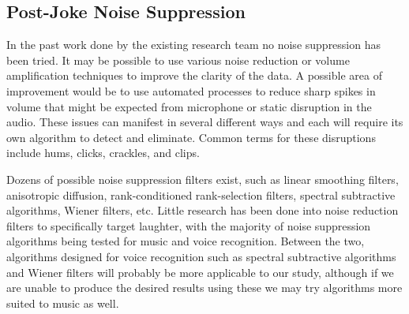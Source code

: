 \documentclass[onecolumn, draftclsnofoot,10pt, compsoc]{IEEEtran}
\begin{document}
\subsection{Post-Joke Noise Suppression}
In the past work done by the existing research team no noise suppression has been tried. It may be possible to use various noise reduction or volume amplification techniques to improve the clarity of the data. A possible area of improvement would be to use automated processes to reduce sharp spikes in volume that might be expected from microphone or static disruption in the audio. These issues can manifest in several different ways and each will require its own algorithm to detect and eliminate. Common terms for these disruptions include hums, clicks, crackles, and clips.\par
\vspace{.3cm}
\noindent Dozens of possible noise suppression filters exist, such as linear smoothing filters, anisotropic diffusion, rank-conditioned rank-selection filters, spectral subtractive algorithms, Wiener filters, etc. Little research has been done into noise reduction filters to specifically target laughter, with the majority of noise suppression algorithms being tested for music and voice recognition. Between the two, algorithms designed for voice recognition such as spectral subtractive algorithms and Wiener filters will probably be more applicable to our study, although if we are unable to produce the desired results using these we may try algorithms more suited to music as well.
\end{document}
